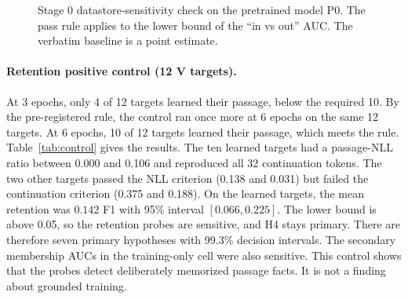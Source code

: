 \documentclass[11pt]{article}
\begin{document}
\begin{figure}[tbp]
\centering
{}
\caption{Stage 0 datastore-sensitivity check on the pretrained model P0. The pass rule applies to the lower bound of the ``in vs out'' AUC. The verbatim baseline is a point estimate.}\label{fig:ds}
\end{figure}

\paragraph{Retention positive control (12 V targets).} At 3 epochs, only 4 of 12 targets learned their passage, below the required 10. By the pre-registered rule, the control ran once more at 6 epochs on the same 12 targets. At 6 epochs, 10 of 12 targets learned their passage, which meets the rule. Table~\ref{tab:control} gives the results. The ten learned targets had a passage-NLL ratio between 0.000 and 0.106 and reproduced all 32 continuation tokens. The two other targets passed the NLL criterion (0.138 and 0.031) but failed the continuation criterion (0.375 and 0.188). On the learned targets, the mean retention was $0.142$ F1 with 95\% interval $[0.066, 0.225]$. The lower bound is above 0.05, so the retention probes are sensitive, and H4 stays primary. There are therefore seven primary hypotheses with 99.3\% decision intervals. The secondary membership AUCs in the training-only cell were also sensitive. This control shows that the probes detect deliberately memorized passage facts. It is not a finding about grounded training.
\end{document}
